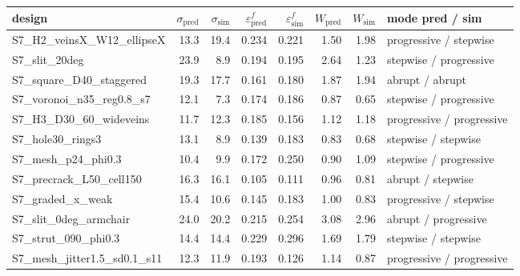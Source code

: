 \begin{tabular}{lrrrrrrl}
\toprule
design & $\sigma_\mathrm{pred}$ & $\sigma_\mathrm{sim}$ & $\varepsilon^f_\mathrm{pred}$ & $\varepsilon^f_\mathrm{sim}$ & $W_\mathrm{pred}$ & $W_\mathrm{sim}$ & mode pred / sim\\ \midrule
S7\_H2\_veinsX\_W12\_ellipseX & 13.3 & 19.4 & 0.234 & 0.221 & 1.50 & 1.98 & progressive / stepwise\\
S7\_slit\_20deg & 23.9 & 8.9 & 0.194 & 0.195 & 2.64 & 1.23 & stepwise / progressive\\
S7\_square\_D40\_staggered & 19.3 & 17.7 & 0.161 & 0.180 & 1.87 & 1.94 & abrupt / abrupt\\
S7\_voronoi\_n35\_reg0.8\_s7 & 12.1 & 7.3 & 0.174 & 0.186 & 0.87 & 0.65 & stepwise / progressive\\
S7\_H3\_D30\_60\_wideveins & 11.7 & 12.3 & 0.185 & 0.156 & 1.12 & 1.18 & progressive / progressive\\
S7\_hole30\_rings3 & 13.1 & 8.9 & 0.139 & 0.183 & 0.83 & 0.68 & stepwise / stepwise\\
S7\_mesh\_p24\_phi0.3 & 10.4 & 9.9 & 0.172 & 0.250 & 0.90 & 1.09 & stepwise / progressive\\
S7\_precrack\_L50\_cell150 & 16.3 & 16.1 & 0.105 & 0.111 & 0.96 & 0.81 & abrupt / stepwise\\
S7\_graded\_x\_weak & 15.4 & 10.6 & 0.145 & 0.183 & 1.00 & 0.83 & progressive / stepwise\\
S7\_slit\_0deg\_armchair & 24.0 & 20.2 & 0.215 & 0.254 & 3.08 & 2.96 & abrupt / progressive\\
S7\_strut\_090\_phi0.3 & 14.4 & 14.4 & 0.229 & 0.296 & 1.69 & 1.79 & stepwise / stepwise\\
S7\_mesh\_jitter1.5\_sd0.1\_s11 & 12.3 & 11.9 & 0.193 & 0.126 & 1.14 & 0.87 & progressive / progressive\\
\bottomrule
\end{tabular}